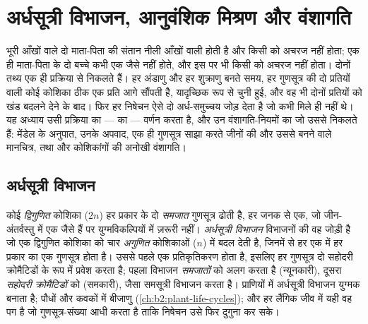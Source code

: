 \chapter{अर्धसूत्री विभाजन, आनुवंशिक मिश्रण और वंशागति}\label{ch:b2:meiosis-heredity}

भूरी आँखों वाले दो माता-पिता की संतान नीली आँखों वाली होती है और किसी को
अचरज नहीं होता; एक ही माता-पिता के दो बच्चे कभी एक जैसे नहीं होते, और
इस पर भी किसी को अचरज नहीं होता। दोनों तथ्य एक ही प्रक्रिया से निकलते
हैं। हर अंडाणु और हर शुक्राणु बनते समय, हर गुणसूत्र की दो प्रतियों वाली
कोई कोशिका ठीक एक प्रति आगे सौंपती है, यादृच्छिक रूप से चुनी हुई, और वह
भी दोनों प्रतियों को खंड बदलने देने के बाद। फिर हर निषेचन ऐसे दो
अर्ध-समुच्चय जोड़ देता है जो कभी मिले ही नहीं थे। यह अध्याय उसी
प्रक्रिया का ---  का --- वर्णन करता है, और उन
वंशागति-नियमों का जो उससे निकलते हैं: मेंडेल के अनुपात, उनके अपवाद, एक
ही गुणसूत्र साझा करते जीनों की  और उससे बनने वाले मानचित्र, तथा
 और कोशिकांगों की अनोखी वंशागति।

\section{अर्धसूत्री विभाजन}

\begin{definition}[अर्धसूत्री विभाजन]\label{def:b2:meiosis-heredity:meiosis}
कोई \emph{द्विगुणित} कोशिका ($2n$) हर प्रकार के दो \emph{समजात}
गुणसूत्र ढोती है, हर जनक से एक, जो जीन-अंतर्वस्तु में एक जैसे हैं पर
युग्मविकल्पियों में ज़रूरी नहीं। \emph{अर्धसूत्री विभाजन} विभाजनों की
वह जोड़ी है जो एक द्विगुणित कोशिका को चार \emph{अगुणित} कोशिकाओं ($n$)
में बदल देती है, जिनमें से हर एक में हर प्रकार का एक गुणसूत्र होता है।
उससे पहले एक प्रतिकृतिकरण होता है, इसलिए हर गुणसूत्र दो सहोदरी
क्रोमैटिडों के रूप में प्रवेश करता है; पहला विभाजन \emph{समजातों} को
अलग करता है (न्यूनकारी), दूसरा \emph{सहोदरी क्रोमैटिडों} को
(समकारी), जैसा समसूत्री विभाजन करता है। प्राणियों में अर्धसूत्री विभाजन
युग्मक बनाता है; पौधों और कवकों में बीजाणु (\cref{ch:b2:plant-life-cycles});
और हर लैंगिक जीव में यही वह पग है जो गुणसूत्र-संख्या आधी करता है ताकि
निषेचन उसे फिर दुगुना कर सके।
\end{definition}

